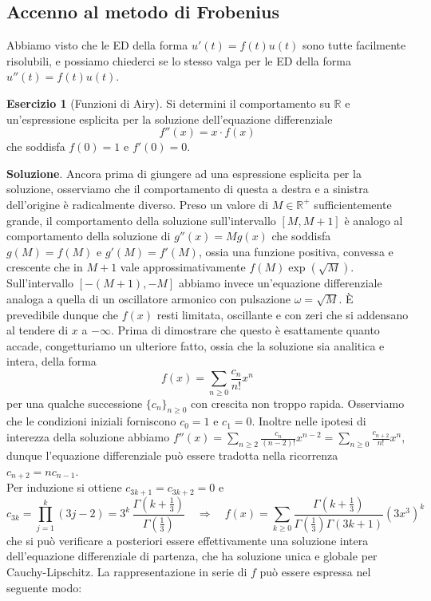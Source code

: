 \documentclass[a4paper,twoside]{article}
\newcommand{\R}{\mathbb{R}}
\theoremstyle{definition}
\newtheorem{ex}[theorem]{Esercizio}
\numberwithin{theorem}{section}
\begin{document}
\subsection{Accenno al metodo di Frobenius}
Abbiamo visto che le ED della forma $u'(t)=f(t)u(t)$ sono tutte facilmente risolubili, e possiamo chiederci se lo stesso valga per le ED della forma $u''(t)=f(t)u(t)$.
\begin{shaded}\begin{ex}[Funzioni di Airy] Si determini il comportamento su $\R$ e un'espressione esplicita per la soluzione dell'equazione differenziale 
$$ f''(x) = x\cdot f(x) $$
che soddisfa $f(0)=1$ e $f'(0)=0$. \end{ex}
\end{shaded}
\textbf{Soluzione}. Ancora prima di giungere ad una espressione esplicita per la soluzione, osserviamo che il comportamento di questa a destra e a sinistra dell'origine è radicalmente diverso. Preso un valore di $M\in\R^+$ sufficientemente grande, il comportamento della soluzione sull'intervallo $[M,M+1]$ è analogo al comportamento della soluzione di $g''(x)=M g(x)$ che soddisfa $g(M)=f(M)$ e $g'(M)=f'(M)$, ossia una funzione positiva, convessa e crescente che in $M+1$ vale approssimativamente $f(M)\exp(\sqrt{M})$. Sull'intervallo $[-(M+1),-M]$ abbiamo invece un'equazione differenziale analoga a quella di un oscillatore armonico con pulsazione $\omega=\sqrt{M}$. È prevedibile dunque che $f(x)$ resti limitata, oscillante e con zeri che si addensano al tendere di $x$ a $-\infty$. Prima di dimostrare che questo è esattamente quanto accade, congetturiamo un ulteriore fatto, ossia che la soluzione sia analitica e intera, della forma 
$$ f(x) = \sum_{n\geq 0}\frac{c_n}{n!}x^n $$
per una qualche successione $\{c_n\}_{n\geq 0}$ con crescita non troppo rapida. Osserviamo che le condizioni iniziali forniscono $c_0=1$ e $c_1=0$. Inoltre nelle ipotesi di interezza della soluzione abbiamo $f''(x)=\sum_{n\geq 2}\frac{c_n}{(n-2)!}x^{n-2}=\sum_{n\geq 0}\frac{c_{n+2}}{n!}x^n$, dunque l'equazione differenziale può essere tradotta nella ricorrenza $c_{n+2}= n c_{n-1}$.\\ Per induzione si ottiene $c_{3k+1}=c_{3k+2}=0$ e
$$ c_{3k} = \prod_{j=1}^{k}(3j-2) = 3^k\,\frac{\Gamma\left(k+\frac{1}{3}\right)}{\Gamma\left(\frac{1}{3}\right)}\quad\Longrightarrow\quad f(x)=\sum_{k\geq 0}\frac{\Gamma\left(k+\frac{1}{3}\right)}{\Gamma\left(\frac{1}{3}\right)\Gamma(3k+1)}(3x^3)^k $$
che si può verificare a posteriori essere effettivamente una soluzione intera dell'equazione differenziale di partenza, che ha soluzione unica e globale per Cauchy-Lipschitz. La rappresentazione in serie di $f$ può essere espressa nel seguente modo:
\end{document}
